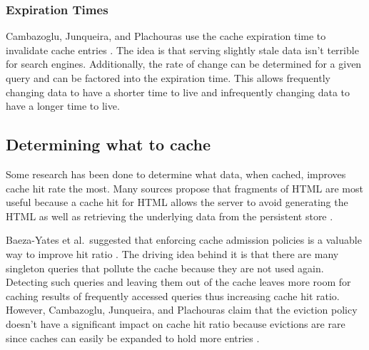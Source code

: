 \documentclass[12pt]{ucthesis}
\begin{document}
\subsubsection{Expiration Times}
Cambazoglu, Junqueira, and Plachouras use the cache expiration time to invalidate cache entries \cite{refreshingPerspectiveSearch}.
The idea is that serving slightly stale data isn't terrible for search engines.
Additionally, the rate of change can be determined for a given query and can be factored into the expiration time.
This allows frequently changing data to have a shorter time to live and infrequently changing data to have a longer time to live.

\subsection{Determining what to cache}
Some research has been done to determine what data, when cached, improves cache hit rate the most.
Many sources propose that fragments of HTML are most useful because a cache hit for HTML allows the server to avoid generating the HTML as well as retrieving the underlying data from the persistent store \cite{comparisonOfCachingSolutions, scalableConsistentCaching, howBasecampGotSoFast}.

Baeza-Yates et al.\ suggested that enforcing cache admission policies is a valuable way to improve hit ratio \cite{cacheAdmissionPolicies}.
The driving idea behind it is that there are many singleton queries that pollute the cache because they are not used again.
Detecting such queries and leaving them out of the cache leaves more room for caching results of frequently accessed queries thus increasing cache hit ratio.
However, Cambazoglu, Junqueira, and Plachouras claim that the eviction policy doesn't have a significant impact on cache hit ratio because evictions are rare since caches can easily be expanded to hold more entries \cite{refreshingPerspectiveSearch}.
\end{document}
